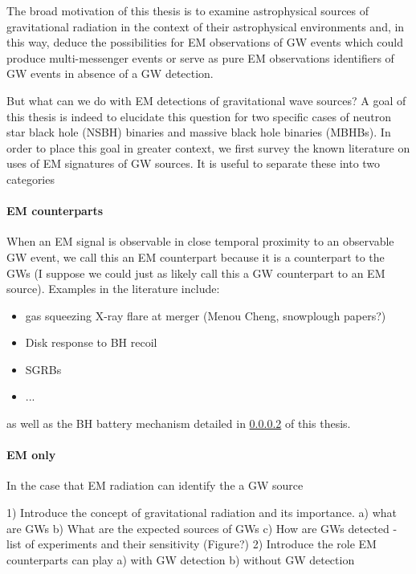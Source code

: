 The broad motivation of this thesis is to examine astrophysical sources of gravitational radiation in the context of their astrophysical environments and, in this way, deduce the possibilities for EM observations of GW events which could produce multi-messenger events or serve as pure EM observations identifiers of GW events in absence of a GW detection.

But what can we do with EM detections of gravitational wave sources? A goal of this thesis is indeed to elucidate this question for two specific cases of neutron star black hole (NSBH) binaries and massive black hole binaries (MBHBs). In order to place this goal in greater context, we first survey the known literature on uses of EM signatures of GW sources. It is useful to separate these into two categories

\paragraph{EM counterparts} When an EM signal is observable in close temporal proximity to an observable GW event, we call this an EM counterpart because it is a counterpart to the GWs (I suppose we could just as likely call this a GW counterpart to an EM source). Examples in the literature include:
\begin{itemize}
\item gas squeezing X-ray flare at merger (Menou Cheng, snowplough papers?)
\item Disk response to BH recoil
\item SGRBs
\item ...
\end{itemize}
as well as the BH battery mechanism detailed in \ref{} of this thesis.

\paragraph{EM only} In the case that EM radiation can identify the a GW source 

 





1)  Introduce the concept of gravitational radiation and its importance.
	a) what are GWs
	b) What are the expected sources of GWs
	c) How are GWs detected - list of experiments and their sensitivity (Figure?)
2) Introduce the role EM counterparts can play 
	a) with GW detection
	b) without GW detection
	
